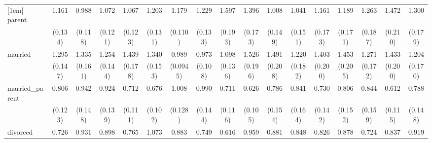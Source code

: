 {\begin{tabular}{l*{16}{c}}
[1em]
parent              &       1.161         &       0.988         &       1.072         &       1.067         &       1.203         &       1.179         &       1.229         &       1.597\sym{***}&       1.396\sym{**} &       1.008         &       1.041         &       1.161         &       1.189         &       1.263         &       1.472\sym{**} &       1.300         \\
                    &     (0.134)         &     (0.118)         &     (0.121)         &     (0.123)         &     (0.131)         &     (0.110)         &     (0.133)         &     (0.193)         &     (0.173)         &     (0.149)         &     (0.151)         &     (0.173)         &     (0.171)         &     (0.187)         &     (0.210)         &     (0.179)         \\
[1em]
married             &       1.295\sym{*}  &       1.335\sym{*}  &       1.254\sym{*}  &       1.439\sym{**} &       1.340\sym{*}  &       0.989         &       0.973         &       1.098         &       1.526\sym{**} &       1.491\sym{**} &       1.220         &       1.403\sym{*}  &       1.453\sym{**} &       1.271         &       1.433\sym{*}  &       1.204         \\
                    &     (0.147)         &     (0.161)         &     (0.144)         &     (0.178)         &     (0.153)         &    (0.0945)         &     (0.108)         &     (0.136)         &     (0.196)         &     (0.208)         &     (0.182)         &     (0.200)         &     (0.205)         &     (0.172)         &     (0.200)         &     (0.170)         \\
[1em]
married\_parent      &       0.806         &       0.942         &       0.924         &       0.712\sym{*}  &       0.676\sym{**} &       1.008         &       0.990         &       0.711\sym{*}  &       0.626\sym{**} &       0.786         &       0.841         &       0.730         &       0.806         &       0.844         &       0.612\sym{**} &       0.788         \\
                    &     (0.123)         &     (0.148)         &     (0.139)         &     (0.111)         &     (0.102)         &     (0.128)         &     (0.144)         &     (0.116)         &     (0.105)         &     (0.154)         &     (0.164)         &     (0.142)         &     (0.152)         &     (0.159)         &     (0.115)         &     (0.148)         \\
[1em]
divorced            &       0.726\sym{*}  &       0.931         &       0.898         &       0.765         &       1.073         &       0.883         &       0.749         &       0.616\sym{**} &       0.959         &       0.881         &       0.848         &       0.826         &       0.878         &       0.724         &       0.837         &       0.919         \\

\end{tabular}}
